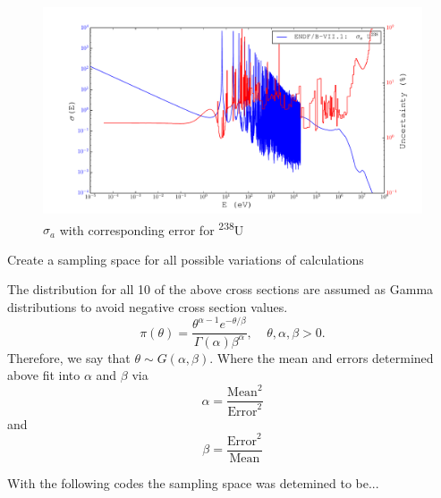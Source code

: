 \documentclass[11pt,notitlepage]{article}
\newcommand{\tss}{\textsuperscript}
\begin{document}
\begin{todolist}
  \begin{figure}[H]
    \begin{center}
      \includegraphics[width=0.77\columnwidth]{../Weighting/X_Sections/XwVar_U_238_92_a.pdf}
      \vspace{-5mm}
      \caption{$\sigma_a$ with corresponding error for \tss{238}U}
      \label{fig:XU238}
    \end{center}
  \end{figure}
  





  
    
\item{Create a sampling space for all possible variations of
  calculations}

  The distribution for all 10 of the above cross sections are
  assumed as Gamma distributions to avoid negative cross section
  values.
  \begin{equation*}
    \pi(\theta)=\frac{\theta^{\alpha-1}e^{-\theta/\beta}}{\Gamma(\alpha)
      \beta^{\alpha}},\ \ \ \ \ \theta,\alpha,\beta>0.
  \end{equation*}
  Therefore, we say that $\theta\sim G(\alpha,\beta)$. Where the mean
  and errors determined above fit into $\alpha$ and $\beta$ via
  \begin{equation*}
    \alpha=\frac{\text{Mean}^2}{\text{Error}^2}
  \end{equation*}
  and
  \begin{equation*}
    \beta=\frac{\text{Error}^2}{\text{Mean}}
  \end{equation*}
  




  
  With the following codes the sampling space was detemined to be...


\end{todolist}
\end{document}

